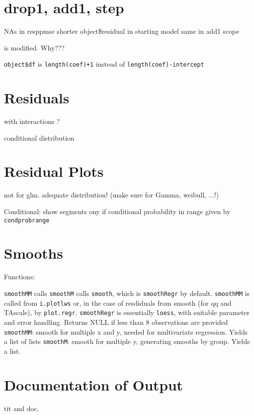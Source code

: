 \documentclass[11pt]{article}
\def\T{\texttt}
\def\code{\texttt}
\begin{document}
\section{drop1, add1, step}
NAs 
\Itm in resppmse \Arrow shorter object\$residual
\Itm in starting model \Arrow same
\Itm in add1 scope 

is modified. Why???

\T{object\$df} is \T{length(coef)+1} instead of
\T{length(coef)-intercept}
\section{Residuals}
with interactions ?

conditional distribution

\section{Residual Plots}
not for glm. adequate distribution! (make sure for Gamma, weibull, ...!)

Conditional: show segments ony if conditional probability in range given by 
\T{condprobrange}

\section{Smooths}
Functions:

\code{smoothMM} calls \code{smoothM} calls \code{smooth}, 
which is \code{smoothRegr} by default.
\code{smoothMM} is called from \code{i.plotlws} or, in the case of
resdiduals from smooth (for qq and TAscale), by \code{plot.regr}.
\Itm
\code{smoothRegr} is essentially \code{loess}, with suitable parameter and
error handling. Returns NULL if less than 8 observations are provided
\Itm
\code{smoothMM}: smooth for multiple x and y, needed for multivariate
regression.
Yields a list of lists
\Itm
\code{smoothM}: smooth for multiple y, generating smooths by group. 
Yields a list.


\section{Documentation of Output}
tit and doc.
\end{document}
